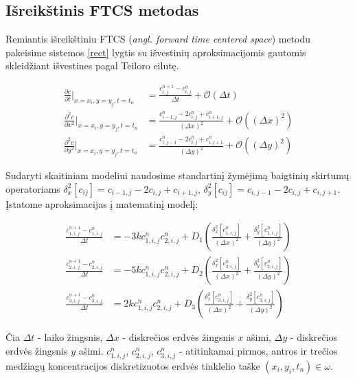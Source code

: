 \subsection{Išreikštinis FTCS metodas}

Remiantis išreikštiniu FTCS (\textit{angl. forward time centered space}) metodu pakeisime sistemos \eqref{rect} lygtis su išvestinių aproksimacijomis gautomis skleidžiant išvestines pagal Teiloro eilutę.

\begin{subequations} \label{finite-diffs}
\begin{align}
	\frac{\partial c}{\partial t}\Big|_{x=x_i, y=y_j, t=t_n}
	&=\frac{c^{n+1}_{i,j}-c^n_{i,j}}{\Delta t} 
	+ \mathcal{O}(\Delta t)\\
	\frac{\partial^2c}{\partial x^2}\Big|_{x=x_i, y=y_j, t=t_n}
	&=\frac{c^n_{i-1,j} - 2c^n_{i,j} + c^n_{i+1,j}}{(\Delta x)^2} 
	+ \mathcal{O}((\Delta x)^2)\\
	\frac{\partial^2c}{\partial y^2}\Big|_{x=x_i, y=y_j, t=t_n}
	&=\frac{c^n_{i,j-1} - 2c^n_{i,j} + c^n_{i,j+1}}{(\Delta y)^2} 
	+ \mathcal{O}((\Delta y)^2)
\end{align}
\end{subequations}

Sudaryti skaitiniam modeliui naudosime standartinį žymėjimą baigtinių skirtumų operatoriams $\delta_x^2[c_{ij}]=c_{i-1,j}-2c_{i,j}+c_{i+1,j}$, $\delta_y^2[c_{ij}]=c_{i,j-1}-2c_{i,j}+c_{i,j+1}$. Įstatome aproksimacijas į matematinį modelį:

\begin{subequations} \label{numerical-eqs}
	\begin{align}
		\frac{c^{n+1}_{1,i,j}-c^n_{1,i,j}}{\Delta t} &=
		-3kc^{n}_{1,i,j}c^{n}_{2,i,j}
		+D_1\left(\frac{\delta_x^2[c^n_{1,i,j}]}{(\Delta x)^2}+\frac{\delta_y^2[c^n_{1,i,j}]}{(\Delta y)^2}\right) \\
		\frac{c^{n+1}_{2,i,j}-c^n_{2,i,j}}{\Delta t} &=
		-5kc^{n}_{1,i,j}c^{n}_{2,i,j}
		+D_2\left(\frac{\delta_x^2[c^n_{2,i,j}]}{(\Delta x)^2}+\frac{\delta_y^2[c^n_{2,i,j}]}{(\Delta y)^2}\right) \\
		\frac{c^{n+1}_{3,i,j}-c^n_{3,i,j}}{\Delta t} &=
		2kc^{n}_{1,i,j}c^{n}_{2,i,j}
		+D_3\left(\frac{\delta_x^2[c^n_{3,i,j}]}{(\Delta x)^2}+\frac{\delta_y^2[c^n_{3,i,j}]}{(\Delta y)^2}\right)
	\end{align}
\end{subequations}

Čia
$\Delta t$ - laiko žingsnis,
$\Delta x$ - diskrečios erdvės žingsnis $x$ ašimi,
$\Delta y$ - diskrečios erdvės žingsnis $y$ ašimi.
$c^n_{1,i,j}$, $c^n_{2,i,j}$, $c^n_{3,i,j}$ - atitinkamai pirmos, antros ir trečios medžiagų koncentracijos diskretizuotos erdvės tinklelio taške $(x_i, y_i, t_n)\in\omega$.